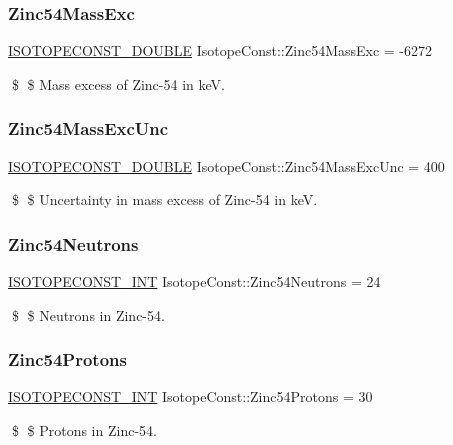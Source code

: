 \subsubsection{\texorpdfstring{Zinc54\+Mass\+Exc}{Zinc54MassExc}}
{\footnotesize\ttfamily \mbox{\hyperlink{group___isotope_const-_macros_ga8f45a7272ce02c0b4c65c44636ed719a}{I\+S\+O\+T\+O\+P\+E\+C\+O\+N\+S\+T\+\_\+\+D\+O\+U\+B\+LE}} Isotope\+Const\+::\+Zinc54\+Mass\+Exc = -\/6272}

\$ \$ Mass excess of Zinc-\/54 in keV. \mbox{\label{group___isotope_const-_zinc-_zn54_ga9d89f17f795e8cf92890bda97580fd87}} 
\subsubsection{\texorpdfstring{Zinc54\+Mass\+Exc\+Unc}{Zinc54MassExcUnc}}
{\footnotesize\ttfamily \mbox{\hyperlink{group___isotope_const-_macros_ga8f45a7272ce02c0b4c65c44636ed719a}{I\+S\+O\+T\+O\+P\+E\+C\+O\+N\+S\+T\+\_\+\+D\+O\+U\+B\+LE}} Isotope\+Const\+::\+Zinc54\+Mass\+Exc\+Unc = 400}

\$ \$ Uncertainty in mass excess of Zinc-\/54 in keV. \mbox{\label{group___isotope_const-_zinc-_zn54_ga6da8b9c4fcc12f097b8674744e892751}} 
\subsubsection{\texorpdfstring{Zinc54\+Neutrons}{Zinc54Neutrons}}
{\footnotesize\ttfamily \mbox{\hyperlink{group___isotope_const-_macros_ga5f18360b3e99483a35c32d789e62621c}{I\+S\+O\+T\+O\+P\+E\+C\+O\+N\+S\+T\+\_\+\+I\+NT}} Isotope\+Const\+::\+Zinc54\+Neutrons = 24}

\$ \$ Neutrons in Zinc-\/54. \mbox{\label{group___isotope_const-_zinc-_zn54_gaab8242d777a3cd06e517618055539bf3}} 
\subsubsection{\texorpdfstring{Zinc54\+Protons}{Zinc54Protons}}
{\footnotesize\ttfamily \mbox{\hyperlink{group___isotope_const-_macros_ga5f18360b3e99483a35c32d789e62621c}{I\+S\+O\+T\+O\+P\+E\+C\+O\+N\+S\+T\+\_\+\+I\+NT}} Isotope\+Const\+::\+Zinc54\+Protons = 30}

\$ \$ Protons in Zinc-\/54. 